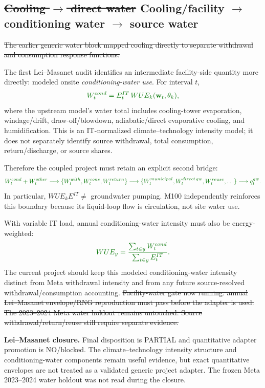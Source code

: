 \documentclass[11pt]{article}
\newcommand{\oldtxt}[1]{\textcolor{blue!70!black}{\sout{#1}}}
\newcommand{\newtxt}[1]{\textcolor{green!45!black}{#1}}
\newcommand{\latesttxt}[1]{\textcolor{purple!85!black}{#1}}
\begin{document}
\subsection[Cooling/facility to conditioning and source water]{\oldtxt{Cooling \(\rightarrow\) direct water} \newtxt{Cooling/facility \(\rightarrow\) conditioning water \(\rightarrow\) source water}}

\oldtxt{The earlier generic water block mapped cooling directly to separate withdrawal and consumption response functions.}

\newtxt{The first Lei--Masanet audit identifies an intermediate facility-side quantity more directly: modeled onsite \emph{conditioning-water use}. For interval \(t\),}
\[
{\color{green!45!black}
W^{cond}_t
=
E^{IT}_t\,WUE_k(\mathbf w_t,\theta_k),
}
\]
\newtxt{where the upstream model's water total includes cooling-tower evaporation, windage/drift, draw-off/blowdown, adiabatic/direct evaporative cooling, and humidification. This is an IT-normalized climate--technology intensity model; it does not separately identify source withdrawal, total consumption, return/discharge, or source shares.}

\newtxt{Therefore the coupled project must retain an explicit second bridge:}
\[
{\color{green!45!black}
W^{cond}_t+W^{other}_t
\longrightarrow
\{W^{with}_t,W^{cons}_t,W^{return}_t\}
\longrightarrow
\{W^{municipal}_t,W^{direct\,gw}_t,W^{reuse}_t,\ldots\}
\longrightarrow q^{gw}_t.
}
\]
\newtxt{In particular, \(WUE_k E^{IT}\neq\) groundwater pumping. M100 independently reinforces this boundary because its liquid-loop flow is circulation, not site water use.}

\newtxt{With variable IT load, annual conditioning-water intensity must also be energy-weighted:}
\[
{\color{green!45!black}
WUE_y
=
\frac{\sum_{t\in y}W^{cond}_t}
     {\sum_{t\in y}E^{IT}_t}.
}
\]
\newtxt{The current project should keep this modeled conditioning-water intensity distinct from Meta withdrawal intensity and from any future source-resolved withdrawal/consumption accounting.}
\oldtxt{Facility-water gate now running: annual Lei--Masanet envelope/RNG reproduction must pass before the adapter is used. The 2023--2024 Meta water holdout remains untouched. Source withdrawal/return/reuse still require separate evidence.}

\latesttxt{\textbf{Lei--Masanet closure.} Final disposition is PARTIAL and quantitative adapter promotion is NO/blocked. The climate--technology intensity structure and conditioning-water components remain useful evidence, but exact quantitative envelopes are not treated as a validated generic project adapter. The frozen Meta 2023--2024 water holdout was not read during the closure.}
\end{document}
